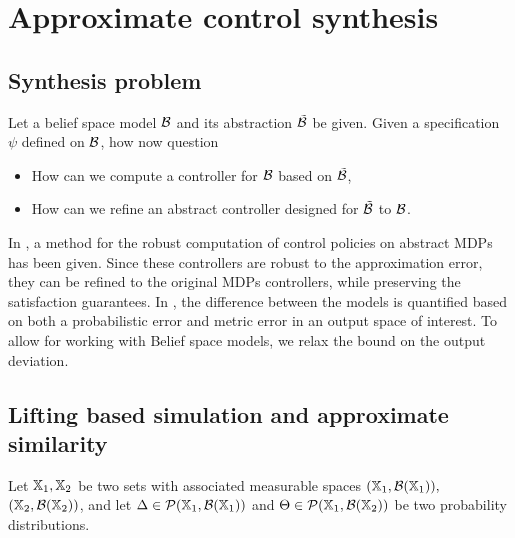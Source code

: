 \documentclass{ifacconf}
\begin{document}
\section{Approximate control synthesis}
\subsection{Synthesis problem}
Let a belief space model $\mathcal{B}$ and its abstraction $\tilde {\mathcal{B}}$ be given.  Given a specification $\psi$ defined on $\mathcal{B}$, how now question
\begin{itemize}
	\item How can we compute a controller for $\mathcal{B}$ based on $\tilde {\mathcal{B}}$,
	\item How can we refine an abstract controller designed for $\tilde{\mathcal{B}}$ to $\mathcal{B}$.
\end{itemize}

In \citet{tech_report_TACAS}, a method for the robust computation of control policies on abstract MDPs has been given.  Since these controllers are robust to the approximation error,  they can be refined to the original MDPs controllers, while preserving the satisfaction guarantees. 
In \citet{tech_report_TACAS}, the difference between the models is quantified based on both a probabilistic error and metric error in an output space of interest. 
To allow for working with Belief space models, we relax the bound on the output deviation.


\subsection{Lifting based simulation  and approximate similarity}

	Let ${\mathbb{X}}_1,{\mathbb{X}}_2$ be two sets with associated measurable spaces $({\mathbb{X}}_1,\mathcal B({\mathbb{X}}_1)),$ $({\mathbb{X}}_2,\mathcal B({\mathbb{X}}_2))$,
	and let   $\Delta\in \mathcal{P}({\mathbb{X}}_1,\mathcal B({\mathbb{X}}_1)) $ and  $\Theta\in \mathcal{P}({\mathbb{X}}_1,\mathcal B({\mathbb{X}}_2)) $ be two probability distributions. 
	
\end{document}
